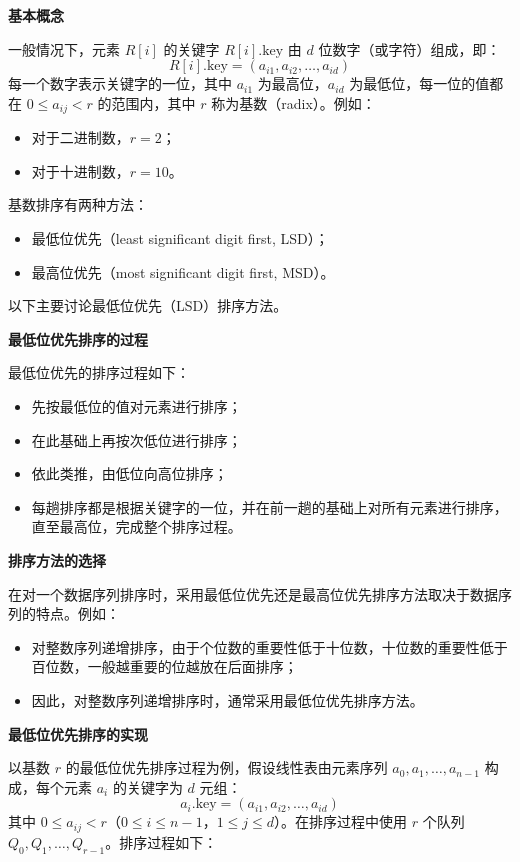 \documentclass[lang=cn,newtx,10pt,scheme=chinese]{elegantbook}
\begin{document}
\textbf{基本概念}  

一般情况下，元素 $R[i]$ 的关键字 $R[i].\text{key}$ 由 $d$ 位数字（或字符）组成，即：
\[
R[i].\text{key} = (a_{i1}, a_{i2}, \dots, a_{id})
\]
每一个数字表示关键字的一位，其中 $a_{i1}$ 为最高位，$a_{id}$ 为最低位，每一位的值都在 $0 \leq a_{ij} < r$ 的范围内，其中 $r$ 称为基数（radix）。例如：
\begin{itemize}
  \item 对于二进制数，$r = 2$；
  \item 对于十进制数，$r = 10$。
\end{itemize}

基数排序有两种方法：
\begin{itemize}
  \item 最低位优先（least significant digit first, LSD）；
  \item 最高位优先（most significant digit first, MSD）。
\end{itemize}
以下主要讨论最低位优先（LSD）排序方法。



\textbf{最低位优先排序的过程}  

最低位优先的排序过程如下：
\begin{itemize}
  \item 先按最低位的值对元素进行排序；
  \item 在此基础上再按次低位进行排序；
  \item 依此类推，由低位向高位排序；
  \item 每趟排序都是根据关键字的一位，并在前一趟的基础上对所有元素进行排序，直至最高位，完成整个排序过程。
\end{itemize}



\textbf{排序方法的选择}  

在对一个数据序列排序时，采用最低位优先还是最高位优先排序方法取决于数据序列的特点。例如：
\begin{itemize}
  \item 对整数序列递增排序，由于个位数的重要性低于十位数，十位数的重要性低于百位数，一般越重要的位越放在后面排序；
  \item 因此，对整数序列递增排序时，通常采用最低位优先排序方法。
\end{itemize}



\textbf{最低位优先排序的实现}  

以基数 $r$ 的最低位优先排序过程为例，假设线性表由元素序列 $a_0, a_1, \dots, a_{n-1}$ 构成，每个元素 $a_i$ 的关键字为 $d$ 元组：
\[
a_i.\text{key} = (a_{i1}, a_{i2}, \dots, a_{id})
\]
其中 $0 \leq a_{ij} < r$（$0 \leq i \leq n-1$，$1 \leq j \leq d$）。在排序过程中使用 $r$ 个队列 $Q_0, Q_1, \dots, Q_{r-1}$。排序过程如下：
\end{document}
